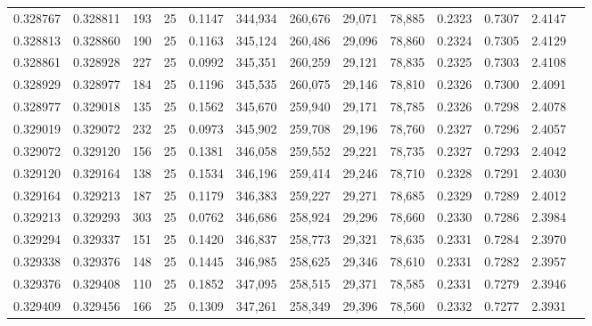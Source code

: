 \begin{tabular}{rrrrrrrrrrrrr}
0.328767 & 0.328811 &   193 &  25 &                                     0.1147 & 344,934 & 260,676 &  29,071 &  78,885 & 0.2323 & 0.7307 & 2.4147 \\
0.328813 & 0.328860 &   190 &  25 &                                     0.1163 & 345,124 & 260,486 &  29,096 &  78,860 & 0.2324 & 0.7305 & 2.4129 \\
0.328861 & 0.328928 &   227 &  25 &                                     0.0992 & 345,351 & 260,259 &  29,121 &  78,835 & 0.2325 & 0.7303 & 2.4108 \\
0.328929 & 0.328977 &   184 &  25 &                                     0.1196 & 345,535 & 260,075 &  29,146 &  78,810 & 0.2326 & 0.7300 & 2.4091 \\
0.328977 & 0.329018 &   135 &  25 &                                     0.1562 & 345,670 & 259,940 &  29,171 &  78,785 & 0.2326 & 0.7298 & 2.4078 \\
0.329019 & 0.329072 &   232 &  25 &                                     0.0973 & 345,902 & 259,708 &  29,196 &  78,760 & 0.2327 & 0.7296 & 2.4057 \\
0.329072 & 0.329120 &   156 &  25 &                                     0.1381 & 346,058 & 259,552 &  29,221 &  78,735 & 0.2327 & 0.7293 & 2.4042 \\
0.329120 & 0.329164 &   138 &  25 &                                     0.1534 & 346,196 & 259,414 &  29,246 &  78,710 & 0.2328 & 0.7291 & 2.4030 \\
0.329164 & 0.329213 &   187 &  25 &                                     0.1179 & 346,383 & 259,227 &  29,271 &  78,685 & 0.2329 & 0.7289 & 2.4012 \\
0.329213 & 0.329293 &   303 &  25 &                                     0.0762 & 346,686 & 258,924 &  29,296 &  78,660 & 0.2330 & 0.7286 & 2.3984 \\
0.329294 & 0.329337 &   151 &  25 &                                     0.1420 & 346,837 & 258,773 &  29,321 &  78,635 & 0.2331 & 0.7284 & 2.3970 \\
0.329338 & 0.329376 &   148 &  25 &                                     0.1445 & 346,985 & 258,625 &  29,346 &  78,610 & 0.2331 & 0.7282 & 2.3957 \\
0.329376 & 0.329408 &   110 &  25 &                                     0.1852 & 347,095 & 258,515 &  29,371 &  78,585 & 0.2331 & 0.7279 & 2.3946 \\
0.329409 & 0.329456 &   166 &  25 &                                     0.1309 & 347,261 & 258,349 &  29,396 &  78,560 & 0.2332 & 0.7277 & 2.3931 \\

\end{tabular}
